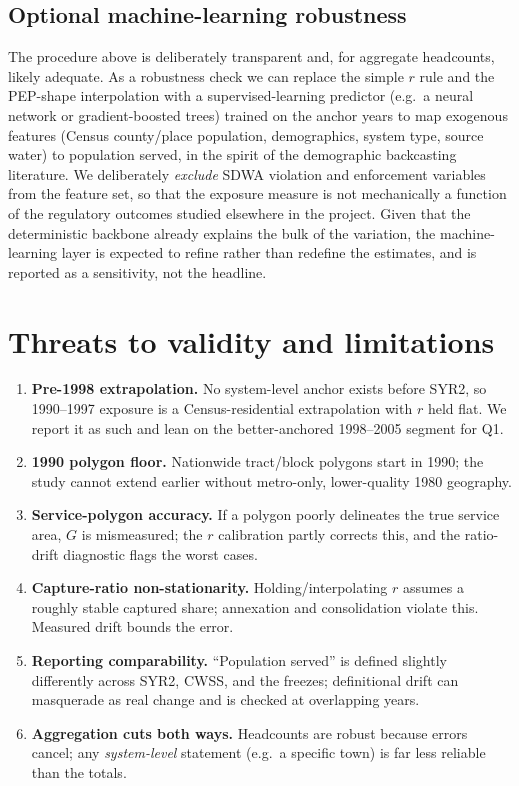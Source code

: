 \documentclass[11pt]{article}
\newcommand{\geopop}{\ensuremath{G}}
\newcommand{\ratio}{\ensuremath{r}}
\begin{document}
\subsection{Optional machine-learning robustness}
\label{sec:ml}
The procedure above is deliberately transparent and, for aggregate headcounts, likely
adequate. As a robustness check we can replace the simple $\ratio$ rule and the
PEP-shape interpolation with a supervised-learning predictor (e.g.\ a neural network
or gradient-boosted trees) trained on the anchor years to map exogenous features
(Census county/place population, demographics, system type, source water) to
population served, in the spirit of the demographic backcasting literature. We
deliberately \emph{exclude} SDWA violation and enforcement variables from the feature
set, so that the exposure measure is not mechanically a function of the regulatory
outcomes studied elsewhere in the project. Given that the deterministic backbone
already explains the bulk of the variation, the machine-learning layer is expected to
refine rather than redefine the estimates, and is reported as a sensitivity, not the
headline.

\section{Threats to validity and limitations}
\label{sec:threats}
\begin{enumerate}[leftmargin=2em]
  \item \textbf{Pre-1998 extrapolation.} No system-level anchor exists before SYR2, so
    1990--1997 exposure is a Census-residential extrapolation with $\ratio$ held flat.
    We report it as such and lean on the better-anchored 1998--2005 segment for Q1.
  \item \textbf{1990 polygon floor.} Nationwide tract/block polygons start in 1990;
    the study cannot extend earlier without metro-only, lower-quality 1980 geography.
  \item \textbf{Service-polygon accuracy.} If a polygon poorly delineates the true
    service area, $\geopop$ is mismeasured; the $\ratio$ calibration partly corrects
    this, and the ratio-drift diagnostic flags the worst cases.
  \item \textbf{Capture-ratio non-stationarity.} Holding/interpolating $\ratio$
    assumes a roughly stable captured share; annexation and consolidation violate this.
    Measured drift bounds the error.
  \item \textbf{Reporting comparability.} ``Population served'' is defined slightly
    differently across SYR2, CWSS, and the freezes; definitional drift can masquerade
    as real change and is checked at overlapping years.
  \item \textbf{Aggregation cuts both ways.} Headcounts are robust because errors
    cancel; any \emph{system-level} statement (e.g.\ a specific town) is far less
    reliable than the totals.
\end{enumerate}
\end{document}
